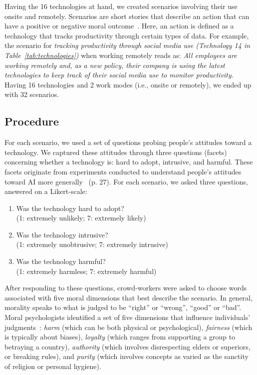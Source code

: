 Having the 16 technologies at hand, we created scenarios involving their use onsite and remotely. Scenarios are short stories that describe an action that can have a positive or negative moral outcome~\cite{hidalgo2021humans}. Here, an action is defined as a technology that tracks productivity through certain types of data. For example, the scenario for \emph{tracking productivity through social media use (Technology 14 in Table~\ref{tab:technologies})} when working remotely reads as:
\emph{All employees are working remotely and, as a new policy, their company is using the latest technologies to keep track of their social media use to monitor productivity.} Having 16 technologies and 2 work modes (i.e., onsite or remotely), we ended up with 32 scenarios.

\subsection{Procedure}
\label{sec:procedure}
For each scenario, we used a set of questions probing people's attitudes toward a technology. We captured these attitudes through three questions (facets) concerning whether a technology is: hard to adopt, intrusive, and harmful. These facets originate from experiments conducted to understand people's attitudes toward AI more generally~\cite{hidalgo2021humans} (p. 27). For each scenario, we asked three questions, answered on a Likert-scale:

\begin{enumerate}
    \item Was the technology hard to adopt? \\ (1: extremely unlikely; 7: extremely likely)
    \item Was the technology intrusive? \\ (1: extremely unobtrusive; 7: extremely intrusive)
    \item Was the technology harmful? \\ (1: extremely harmless; 7: extremely harmful)
\end{enumerate}

After responding to these questions, crowd-workers were asked to choose words associated with five moral dimensions that best describe the scenario. In general, morality speaks to what is judged to be ``right'' or ``wrong'', ``good'' or ``bad''. Moral psychologists identified a set of five dimensions that influence individuals' judgments~\cite{haidt2007new}: \emph{harm} (which can be both physical or psychological), \emph{fairness} (which is typically about biases), \emph{loyalty} (which ranges from supporting a group to betraying a country), \emph{authority} (which involves disrespecting elders or superiors, or breaking rules), and \emph{purity} (which involves concepts as varied as the sanctity of religion or personal hygiene).

